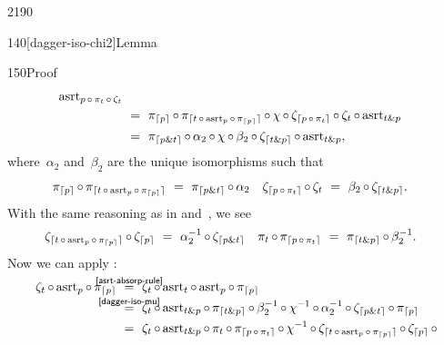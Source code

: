 \begin{parsec}{2190}
\begin{point}{140}[dagger-iso-chi2]{Lemma}
\begin{point}{150}{Proof}
\begin{align*}
        \asrt_{p \after \pi_t\after \zeta_t} \\
                    & \  = \ 
        \pi_{\ceil{p}} \after 
        \pi_{\lceil t \after
        \asrt_p \after \pi_{\ceil{p}}\rceil} \after
        \chi \after
        \zeta_{\ceil{p \after \pi_t}} \after
        \zeta_t \after
        \asrt_{\andthen{t}{p}} \\
                    & \  = \ 
        \pi_{\ceil{\andthen{p}{t}}} \after \alpha_2 \after
        \chi \after \beta_2 \after
        \zeta_{\ceil{\andthen{t}{p}}} \after
        \asrt_{\andthen{t}{p}},
    \end{align*}
where~$\alpha_2$ and~$\beta_2$ are the unique isomorphisms such that
\begin{align*}
        \pi_{\ceil{p}} \after 
        \pi_{\lceil t \after
        \asrt_p \after \pi_{\ceil{p}}\rceil} &\ = \ 
            \pi_{\ceil{\andthen{p}{t}}} \after \alpha_2 &
        \zeta_{\ceil{p \after \pi_t}} \after
        \zeta_t
        &\ = \ 
        \beta_2 \after \zeta_{\ceil{\andthen{t}{p}}}.
\end{align*}
With the same reasoning as in 
        and~, we see
\begin{align*}
        \zeta_{\lceil t \after
        \asrt_p \after \pi_{\ceil{p}}\rceil} \after
        \zeta_{\ceil{p}}
        &\ = \ 
        \alpha_2^{-1} \after
            \zeta_{\ceil{\andthen{p}{t}}}
            &
        \pi_t \after
        \pi_{\ceil{p \after \pi_t}}
        &\ = \ 
        \pi_{\ceil{\andthen{t}{p}}}
        \after \beta_2^{-1}.
\end{align*}
Now we can apply :
\begin{align*}
    \zeta_t \after \asrt_p \after \pi_{\ceil{p}} 
    &\ \overset{\smash{\mathclap{\sref{asrt-absorp-rule}}}}{=} \ 
    \zeta_t \after \asrt_t \after
    \asrt_p \after
    \pi_{\ceil{p}}
    \\
    &\ \overset{\smash{\mathclap{\sref{dagger-iso-mu}}}}{=} \ 
    \zeta_t \after \asrt_{\andthen{t}{p}} \after
    \pi_{\ceil{\andthen{t}{p}}} \after
    \beta_2^{-1} \after
    \chi^{-1} \after
    \alpha_2^{-1} \after
    \zeta_{\ceil{\andthen{p}{t}}} \after
    \pi_{\ceil{p}}
    \\
    &\ = \ 
    \zeta_t \after \asrt_{\andthen{t}{p}} \after
        \pi_t \after
        \pi_{\ceil{p \after \pi_t}} \after
    \chi^{-1} \after
        \zeta_{\lceil t \after
        \asrt_p \after \pi_{\ceil{p}}\rceil} \after
        \zeta_{\ceil{p}} \after

\end{align*}
\end{point}
\end{point}
\end{parsec}
